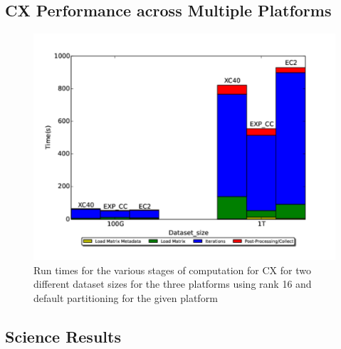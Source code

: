   \subsection{CX Performance across Multiple Platforms}
  \label{sect:h2h}
    
    \begin{figure} [H]
    \begin{centering}
    \includegraphics[scale=0.4]{images/CX_Size_Scaling_Rank_16_Partitions_default.pdf}
    \end{centering}
    \caption{ Run times for the various stages of computation for CX for two different dataset sizes for the three platforms using rank 16 and default partitioning for the given platform} 
    \label{fig:h2hrank16} 
    \end{figure}

    
  

  


  \subsection{Science Results}
